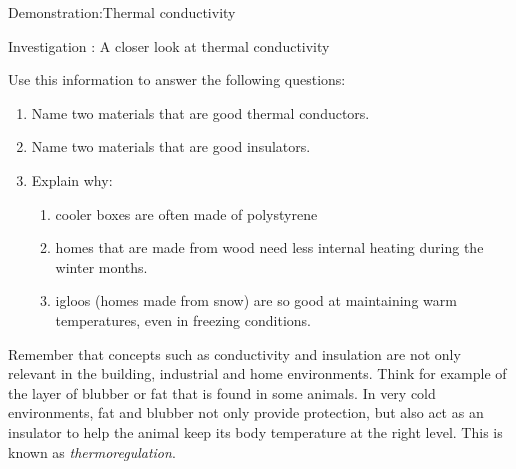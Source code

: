 \begin{gexperiment}{Demonstration:Thermal conductivity}
\begin{gexperiment}{Investigation : A closer look at thermal conductivity}
{\begin{table}[H]
\end{table}
    \par
      \label{m38706*id67009}Use this information to answer the following questions:\par 
      \label{m38706*id67013}\begin{enumerate}[noitemsep, label=\textbf{\arabic*}. ] 
            \label{m38706*uid105}\item Name two materials that are good thermal conductors.
\label{m38706*uid106}\item Name two materials that are good insulators.
\label{m38706*uid107}\item Explain why:
\label{m38706*id67053}\begin{enumerate}[noitemsep, label=\textbf{\alph*}. ] 
            \label{m38706*uid108}\item cooler boxes are often made of polystyrene
\label{m38706*uid109}\item homes that are made from wood need less internal heating during the winter months.
\label{m38706*uid110}\item igloos (homes made from snow) are so good at maintaining warm temperatures, even in freezing conditions.
\end{enumerate}
        \end{enumerate}}
\end{gexperiment}
\label{m38706*notfhsst!!!underscore!!!id564}
	\par
      \label{m38706*id67129}Remember that concepts such as conductivity and insulation are not only relevant in the building, industrial and home environments. Think for example of the layer of blubber or fat that is found in some animals. In very cold environments, fat and blubber not only provide protection, but also act as an insulator to help the animal keep its body temperature at the right level. This is known as \textsl{thermoregulation}.\par 
    \label{m38706*cid8}

\end{gexperiment}
